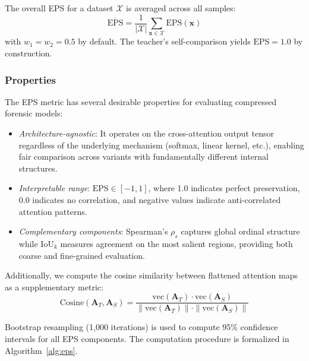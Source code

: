 \documentclass[lettersize,journal]{IEEEtran}
\begin{document}
The overall EPS for a dataset $\mathcal{X}$ is averaged across all samples:
\begin{equation}
    \overline{\text{EPS}} = \frac{1}{|\mathcal{X}|} \sum_{\mathbf{x} \in \mathcal{X}} \text{EPS}(\mathbf{x})
\end{equation}
with $w_1 = w_2 = 0.5$ by default. The teacher's self-comparison yields $\text{EPS} = 1.0$ by construction.

\subsubsection{Properties}
The EPS metric has several desirable properties for evaluating compressed forensic models:
\begin{itemize}
    \item \textit{Architecture-agnostic}: It operates on the cross-attention output tensor regardless of the underlying mechanism (softmax, linear kernel, etc.), enabling fair comparison across variants with fundamentally different internal structures.
    \item \textit{Interpretable range}: $\text{EPS} \in [-1, 1]$, where 1.0 indicates perfect preservation, 0.0 indicates no correlation, and negative values indicate anti-correlated attention patterns.
    \item \textit{Complementary components}: Spearman's $\rho_s$ captures global ordinal structure while $\text{IoU}_k$ measures agreement on the most salient regions, providing both coarse and fine-grained evaluation.
\end{itemize}

Additionally, we compute the cosine similarity between flattened attention maps as a supplementary metric:
\begin{equation}
    \text{Cosine}(\mathbf{A}_T, \mathbf{A}_S) = \frac{\text{vec}(\mathbf{A}_T) \cdot \text{vec}(\mathbf{A}_S)}{\|\text{vec}(\mathbf{A}_T)\| \cdot \|\text{vec}(\mathbf{A}_S)\|}
\end{equation}

Bootstrap resampling (1{,}000 iterations) is used to compute 95\% confidence intervals for all EPS components. The computation procedure is formalized in Algorithm~\ref{alg:eps}.
\end{document}
